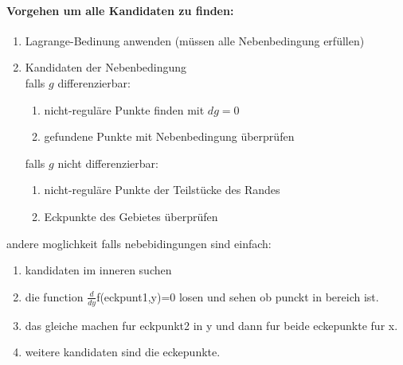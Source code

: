 \documentclass[11pt]{article}
\begin{document}
\paragraph{Vorgehen um alle Kandidaten zu finden:}
\begin{enumerate}[noitemsep]
	\item Lagrange-Bedinung anwenden (m{\"u}ssen alle Nebenbedingung erf{\"u}llen)
	\item Kandidaten der Nebenbedingung \\
	falls $g$ differenzierbar: 
	\begin{enumerate}[noitemsep]
		\item nicht-regul{\"a}re Punkte finden mit $dg = 0$
		\item gefundene Punkte mit Nebenbedingung {\"u}berpr{\"u}fen
	\end{enumerate}
	falls $g$ nicht differenzierbar:
	\begin{enumerate}[noitemsep]
		\item nicht-regul{\"a}re Punkte der Teilst{\"u}cke des Randes
		\item Eckpunkte des Gebietes {\"u}berpr{\"u}fen
	\end{enumerate}
\end{enumerate}
andere moglichkeit falls nebebidingungen sind einfach:
\begin{enumerate}
	\item kandidaten im inneren suchen
	\item die function $\frac{d}{dy}$f(eckpunt1,y)=0 losen und sehen ob punckt in bereich ist.
	\item das gleiche machen fur eckpunkt2 in y und dann fur beide eckepunkte fur x.
	\item weitere kandidaten sind die eckepunkte.
\end{enumerate}
\end{document}
